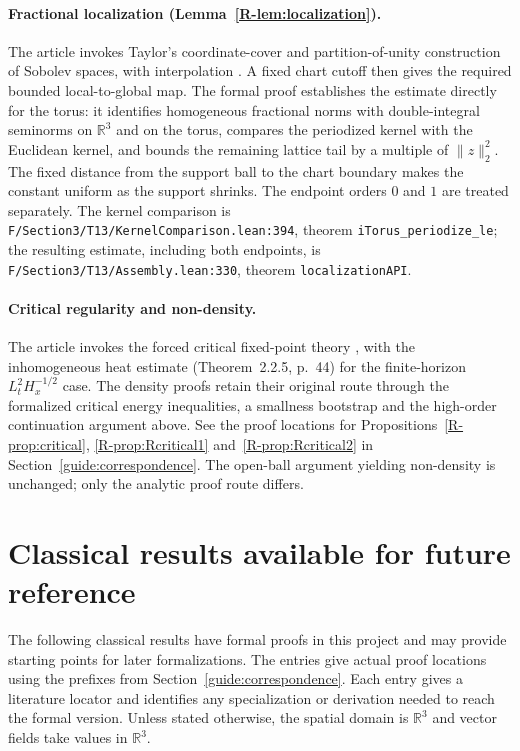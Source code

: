 \documentclass[11pt,a4paper]{article}
\newcommand{\code}[1]{\nolinkurl{#1}}
\newcommand{\paperref}[1]{\ref{R-#1}}
\newcommand{\source}[4]{\code{#1.lean:#2}, #4 \code{#3}}
\begin{document}
\paragraph{Fractional localization (Lemma~\paperref{lem:localization}).}
The article invokes Taylor's coordinate-cover and partition-of-unity
construction of Sobolev spaces, with interpolation
\cite[Chapter~4, Sections~2--3]{taylor}. A fixed chart cutoff then gives the
required bounded local-to-global map. The formal proof establishes the
estimate directly for the torus: it identifies homogeneous fractional norms
with double-integral seminorms on $\mathbb R^3$ and on the torus, compares the
periodized kernel with the Euclidean kernel, and bounds the remaining lattice
tail by a multiple of $\|z\|_2^2$. The fixed distance from the support ball to
the chart boundary makes the constant uniform as the support shrinks.
The endpoint orders $0$ and $1$ are treated separately.
The kernel comparison is
\source{F/Section3/T13/KernelComparison}{394}{iTorus_periodize_le}{theorem};
the resulting estimate, including both endpoints, is
\source{F/Section3/T13/Assembly}{330}{localizationAPI}{theorem}.

\paragraph{Critical regularity and non-density.}
The article invokes the forced critical fixed-point theory
\cite[Theorem~2.3.1 and Lemma~2.3.2, pp.~47--49]{danchin}, with the
inhomogeneous heat estimate (Theorem~2.2.5, p.~44) for the finite-horizon
$L^2_tH^{-1/2}_x$ case. The density proofs retain their original route through the formalized
critical energy inequalities, a smallness bootstrap and the high-order
continuation argument above. See the proof locations for
Propositions~\paperref{prop:critical}, \paperref{prop:Rcritical1}
and~\paperref{prop:Rcritical2} in Section~\ref{guide:correspondence}. The open-ball argument yielding
non-density is unchanged; only the analytic proof route differs.

\section{Classical results available for future reference}\label{guide:classical}
The following classical results have formal proofs in this project and may
provide starting points for later formalizations. The entries give actual
proof locations using the prefixes from Section~\ref{guide:correspondence}. Each entry gives a literature locator and identifies any specialization or
derivation needed to reach the formal version. Unless stated otherwise, the spatial domain is
$\mathbb R^3$ and vector fields take values in $\mathbb R^3$.
\end{document}
